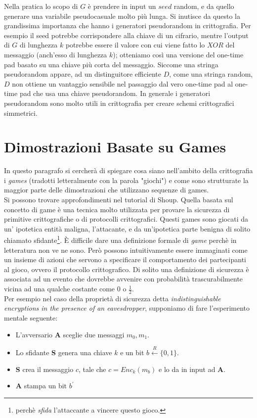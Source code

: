 \documentclass[a4paper,openright,twoside,12pt]{report}
\begin{document}
Nella pratica lo scopo di $G$ \`e prendere in input un $seed$ random, e da quello generare una variabile pseudocasuale molto pi\`u lunga. Si inutisce da questo la grandissima
importanza che hanno i generatori pseudorandom in crittografia. Per esempio il seed potrebbe corrispondere alla chiave di un cifrario, mentre l'output di $G$ di lunghezza $k$ potrebbe
essere il valore con cui viene fatto lo $XOR$ del messaggio (anch'esso di lunghezza $k$); otteniamo cos\`i una versione del one-time pad basato su una chiave pi\`u corta del messaggio.
Siccome una stringa pseudorandom appare, ad un distinguitore efficiente $D$, come una stringa random, $D$ non ottiene un vantaggio sensibile nel passaggio dal vero one-time pad
al one-time pad che usa una chiave pseudorandom. In generale i generatori pseudorandom sono molto utili in crittografia per creare schemi crittografici simmetrici.

\section{Dimostrazioni Basate su Games}
In questo paragrafo si cercher\`a di spiegare cosa siano nell'ambito della crittografia i \emph{games} (tradotti letteralmente con la parola "giochi") e come sono strutturate la maggior parte delle dimostrazioni
che utilizzano sequenze di games.\\Si possono trovare approfondimenti nel tutorial di Shoup\cite{shoup}.
Quella basata sul concetto di game \`e una tecnica molto utilizzata per provare la sicurezza di primitive crittografiche o di protocolli crittografici.
Questi games sono giocati da un' ipotetica entit\`a maligna, l'attacante, e da un'ipotetica parte benigna di solito chiamato sfidante\footnote{perch\`e \emph{sfida} l'attaccante a 
vincere questo gioco.}. 
\`E difficile dare una definizione formale di \emph{game} perch\`e in letteratura non ve ne sono. Per\`o possono intuitivamente essere immaginati come un insieme di
azioni che servono a specificare il comportamento dei partecipanti al gioco, ovvero il protocollo crittografico.
Di solito una definizione di sicurezza \`e associata ad un evento che dovrebbe avvenire con probabilit\`a trascurabilmente vicina ad una qualche costante come 
$0$ o $\frac{1}{2}$.\\
Per esempio nel caso della propriet\`a di sicurezza detta \emph{indistinguishable encryptions in the presence of an eavesdropper}, supponiamo di fare l'esperimento 
mentale seguente:
\begin{itemize}
 \item L'avversario \textbf{A} sceglie due messaggi $m_0, m_1$.
 \item Lo sfidante \textbf{S} genera una chiave $k$ e un bit $b \xleftarrow{R} \{0,1\}$.
 \item \textbf{S} crea il messaggio $c$, tale che $c= Enc_k(m_b)$ e lo da in input ad \textbf{A}.
 \item \textbf{A} stampa un bit $b^{'}$
\end{itemize}
\end{document}
